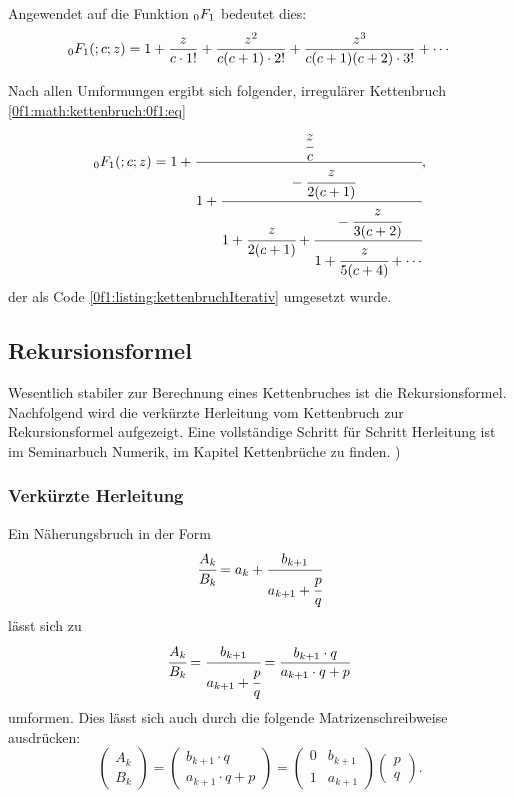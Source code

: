 Angewendet auf die Funktion $\mathstrut_0F_1$ bedeutet dies:
\begin{equation*}
	\mathstrut_0F_1(;c;z) = 1 + \frac{z}{c\cdot1!} + \frac{z^2}{c(c+1)\cdot2!} + \frac{z^3}{c(c+1)(c+2)\cdot3!} + \cdots
\end{equation*}
\cite{0f1:wiki-fraction}

Nach allen Umformungen ergibt sich folgender, irregulärer Kettenbruch \eqref{0f1:math:kettenbruch:0f1:eq}
\begin{equation}
	\label{0f1:math:kettenbruch:0f1:eq}
	\mathstrut_0F_1(;c;z) = 1 + \cfrac{\cfrac{z}{c}}{1+\cfrac{-\cfrac{z}{2(c+1)}}{1+\cfrac{z}{2(c+1)}+\cfrac{-\cfrac{z}{3(c+2)}}{1+\cfrac{z}{5(c+4)} + \cdots}}},
\end{equation}
der als Code \ref{0f1:listing:kettenbruchIterativ} umgesetzt wurde. 
\cite{0f1:wolfram-0f1}



\subsection{Rekursionsformel
\label{0f1:subsection:rekursionsformel}}
Wesentlich stabiler zur Berechnung eines Kettenbruches ist die Rekursionsformel. Nachfolgend wird die verkürzte Herleitung vom Kettenbruch zur Rekursionsformel aufgezeigt. Eine vollständige Schritt für Schritt Herleitung ist im Seminarbuch Numerik, im Kapitel Kettenbrüche zu finden. \cite{0f1:kettenbrueche})

\subsubsection{Verkürzte Herleitung}
Ein Näherungsbruch in der Form
\begin{align*}
	\cfrac{A_k}{B_k} = a_k + \cfrac{b_{k + 1}}{a_{k + 1} + \cfrac{p}{q}}
\end{align*}
lässt sich zu
\begin{align*}
	\cfrac{A_k}{B_k} = \cfrac{b_{k+1}}{a_{k+1} + \cfrac{p}{q}} = \frac{b_{k+1} \cdot q}{a_{k+1} \cdot q + p}
\end{align*}
umformen.
Dies lässt sich auch durch die folgende Matrizenschreibweise ausdrücken:
\begin{equation*}
	\begin{pmatrix}
		A_k\\
		B_k
	\end{pmatrix}
	= 		\begin{pmatrix}
		b_{k+1} \cdot q\\
		a_{k+1} \cdot q + p
	\end{pmatrix}
	=\begin{pmatrix}
		0&	b_{k+1}\\
		1&	a_{k+1}
	\end{pmatrix}
	\begin{pmatrix}
		p \\
		q
	\end{pmatrix}.
\end{equation*}

